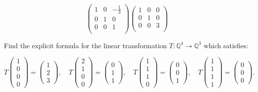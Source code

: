 \documentclass{eh-homework}
\begin{document}
\begin{question}{2}
\[\begin{pmatrix}
                1 & 0 &  -\frac{1}{3} \\
                0 & 1 &  0 \\
                0 & 0 &  1 \\
            \end{pmatrix}
            \begin{pmatrix}
                1 & 0 &  0 \\
                0 & 1 &  0 \\
                0 & 0 &  3 \\
            \end{pmatrix}
        \]
    \end{question}

    \begin{question}{3}
        Find the explicit formula for the linear transformation \( T : \mathbb{Q}^4 \to \mathbb{Q}^3 \) which satisfies:

        \[
        T\begin{pmatrix} 1 \\ 0 \\ 0 \\ 0 \end{pmatrix} = \begin{pmatrix} 1 \\ 2 \\ 3 \end{pmatrix}, \quad
        T\begin{pmatrix} 2 \\ 1 \\ 0 \\ 0 \end{pmatrix} = \begin{pmatrix} 0 \\ 1 \\ 1 \end{pmatrix}, \quad
        T\begin{pmatrix} 1 \\ 1 \\ 1 \\ 0 \end{pmatrix} = \begin{pmatrix} 0 \\ 0 \\ 1 \end{pmatrix}, \quad
        T\begin{pmatrix} 1 \\ 1 \\ 1 \\ 1 \end{pmatrix} = \begin{pmatrix} 0 \\ 0 \\ 0 \end{pmatrix}.
        \]
    \end{question}
\end{document}
